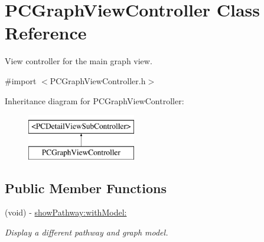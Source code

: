 \hypertarget{interface_p_c_graph_view_controller}{
\section{PCGraphViewController Class Reference}
\label{interface_p_c_graph_view_controller}
}


View controller for the main graph view.  




{\ttfamily \#import $<$PCGraphViewController.h$>$}

Inheritance diagram for PCGraphViewController:\begin{figure}[h!]
\begin{center}
\leavevmode
\includegraphics[height=2.000000cm]{kegg_doc/interface_p_c_graph_view_controller}
\end{center}
\end{figure}
\subsection*{Public Member Functions}
\begin{DoxyCompactItemize}
\item 
\hypertarget{interface_p_c_graph_view_controller_a67d9121c3648d9ce9e6269fd981174c5}{
(void) -\/ \hyperlink{interface_p_c_graph_view_controller_a67d9121c3648d9ce9e6269fd981174c5}{showPathway:withModel:}}
\label{interface_p_c_graph_view_controller_a67d9121c3648d9ce9e6269fd981174c5}

\begin{DoxyCompactList}\small\item\em Display a different pathway and graph model. \end{DoxyCompactList}\end{DoxyCompactItemize}
